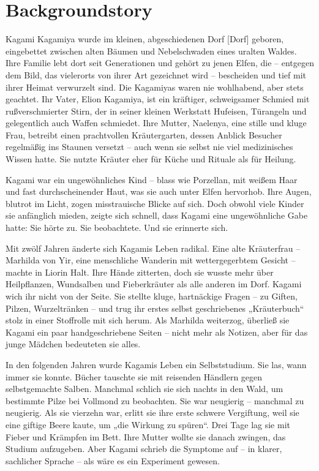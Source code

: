 \documentclass[12pt,a4paper]{article}
\begin{document}
\newpage

\section{Backgroundstory}

Kagami Kagamiya wurde im kleinen, abgeschiedenen Dorf [Dorf] geboren, eingebettet zwischen alten Bäumen und Nebelschwaden eines uralten Waldes. Ihre Familie lebt dort seit Generationen und gehört zu jenen Elfen, die – entgegen dem Bild, das vielerorts von ihrer Art gezeichnet wird – bescheiden und tief mit ihrer Heimat verwurzelt sind. Die Kagamiyas waren nie wohlhabend, aber stets geachtet. Ihr Vater, Elion Kagamiya, ist ein kräftiger, schweigsamer Schmied mit rußverschmierter Stirn, der in seiner kleinen Werkstatt Hufeisen, Türangeln und gelegentlich auch Waffen schmiedet. Ihre Mutter, Naelenya, eine stille und kluge Frau, betreibt einen prachtvollen Kräutergarten, dessen Anblick Besucher regelmäßig ins Staunen versetzt – auch wenn sie selbst nie viel medizinisches Wissen hatte. Sie nutzte Kräuter eher für Küche und Rituale als für Heilung.

Kagami war ein ungewöhnliches Kind – blass wie Porzellan, mit weißem Haar und fast durchscheinender Haut, was sie auch unter Elfen hervorhob. Ihre Augen, blutrot im Licht, zogen misstrauische Blicke auf sich. Doch obwohl viele Kinder sie anfänglich mieden, zeigte sich schnell, dass Kagami eine ungewöhnliche Gabe hatte: Sie hörte zu. Sie beobachtete. Und sie erinnerte sich.

Mit zwölf Jahren änderte sich Kagamis Leben radikal. Eine alte Kräuterfrau – Marhilda von Yir, eine menschliche Wanderin mit wettergegerbtem Gesicht – machte in Liorin Halt. Ihre Hände zitterten, doch sie wusste mehr über Heilpflanzen, Wundsalben und Fieberkräuter als alle anderen im Dorf. Kagami wich ihr nicht von der Seite. Sie stellte kluge, hartnäckige Fragen – zu Giften, Pilzen, Wurzeltränken – und trug ihr erstes selbst geschriebenes „Kräuterbuch“ stolz in einer Stoffrolle mit sich herum. Als Marhilda weiterzog, überließ sie Kagami ein paar handgeschriebene Seiten – nicht mehr als Notizen, aber für das junge Mädchen bedeuteten sie alles.

In den folgenden Jahren wurde Kagamis Leben ein Selbststudium. Sie las, wann immer sie konnte. Bücher tauschte sie mit reisenden Händlern gegen selbstgemachte Salben. Manchmal schlich sie sich nachts in den Wald, um bestimmte Pilze bei Vollmond zu beobachten. Sie war neugierig – manchmal zu neugierig. Als sie vierzehn war, erlitt sie ihre erste schwere Vergiftung, weil sie eine giftige Beere kaute, um „die Wirkung zu spüren“. Drei Tage lag sie mit Fieber und Krämpfen im Bett. Ihre Mutter wollte sie danach zwingen, das Studium aufzugeben. Aber Kagami schrieb die Symptome auf – in klarer, sachlicher Sprache – als wäre es ein Experiment gewesen.
\end{document}
